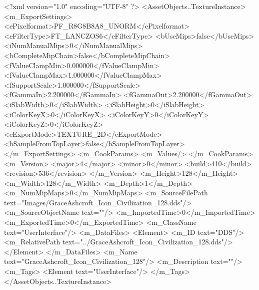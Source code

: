 <?xml version="1.0" encoding="UTF-8" ?>
<AssetObjects..TextureInstance>
	<m_ExportSettings>
		<ePixelformat>PF_R8G8B8A8_UNORM</ePixelformat>
		<eFilterType>FT_LANCZOS6</eFilterType>
		<bUseMips>false</bUseMips>
		<iNumManualMips>0</iNumManualMips>
		<bCompleteMipChain>false</bCompleteMipChain>
		<fValueClampMin>0.000000</fValueClampMin>
		<fValueClampMax>1.000000</fValueClampMax>
		<fSupportScale>1.000000</fSupportScale>
		<fGammaIn>2.200000</fGammaIn>
		<fGammaOut>2.200000</fGammaOut>
		<iSlabWidth>0</iSlabWidth>
		<iSlabHeight>0</iSlabHeight>
		<iColorKeyX>0</iColorKeyX>
		<iColorKeyY>0</iColorKeyY>
		<iColorKeyZ>0</iColorKeyZ>
		<eExportMode>TEXTURE_2D</eExportMode>
		<bSampleFromTopLayer>false</bSampleFromTopLayer>
	</m_ExportSettings>
	<m_CookParams>
		<m_Values/>
	</m_CookParams>
	<m_Version>
		<major>4</major>
		<minor>0</minor>
		<build>410</build>
		<revision>536</revision>
	</m_Version>
	<m_Height>128</m_Height>
	<m_Width>128</m_Width>
	<m_Depth>1</m_Depth>
	<m_NumMipMaps>0</m_NumMipMaps>
	<m_SourceFilePath text="Images/GraceAshcroft_Icon_Civilization_128.dds"/>
	<m_SourceObjectName text=""/>
	<m_ImportedTime>0</m_ImportedTime>
	<m_ExportedTime>0</m_ExportedTime>
	<m_ClassName text="UserInterface"/>
	<m_DataFiles>
		<Element>
			<m_ID text="DDS"/>
			<m_RelativePath text="../GraceAshcroft_Icon_Civilization_128.dds"/>
		</Element>
	</m_DataFiles>
	<m_Name text="GraceAshcroft_Icon_Civilization_128"/>
	<m_Description text=""/>
	<m_Tags>
		<Element text="UserInterface"/>
	</m_Tags>
</AssetObjects..TextureInstance>
